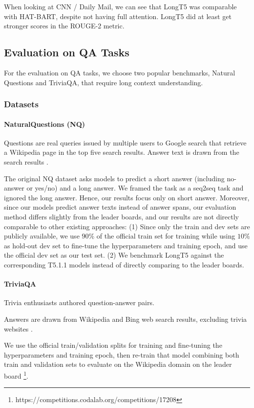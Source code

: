 When looking at CNN / Daily Mail, we can see that LongT5 was comparable with HAT-BART, despite not having full attention. LongT5 did at least get stronger scores in the ROUGE-2 metric.

\subsection{Evaluation on QA Tasks} For the evaluation on QA tasks, we choose two popular benchmarks, Natural Questions and TriviaQA, that require long context understanding.  

\subsubsection{Datasets}\label{subsec:qa-datasets}

\paragraph{NaturalQuestions (NQ)} Questions are real queries issued by multiple users to Google search that retrieve a Wikipedia page in the top five search results. Answer text is drawn from the search results \cite{naturalquestions}.

The original NQ dataset asks models to predict a short answer (including no-answer or yes/no) and a long answer. We framed the task as a seq2seq task and ignored the long answer. Hence, our results focus only on short answer. Moreover, since our models predict answer texts instead of answer spans, our evaluation method differs slightly from the leader boards, and our results are not directly comparable to other existing approaches: (1) Since only the train and dev sets are publicly available, we use $90\%$ of the official train set for training while using $10\%$ as hold-out dev set to fine-tune the hyperparameters and training epoch, and use the official dev set as our test set. (2) We benchmark LongT5 against the corresponding T5.1.1 models instead of directly comparing to the leader boards.

\paragraph{TriviaQA} Trivia enthusiasts authored question-answer pairs.

Answers are drawn from Wikipedia and Bing web search results, excluding trivia websites \cite{triviaqa}.

We use the official train/validation splits for training and fine-tuning the hyperparameters and training epoch, then re-train that model combining both train and validation sets to evaluate on the Wikipedia domain on the leader board \footnote{https://competitions.codalab.org/competitions/17208}.

